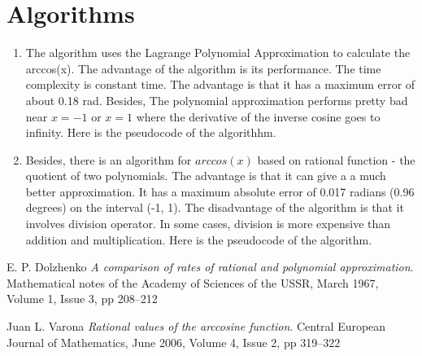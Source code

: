 \documentclass[10pt]{article}
\newcommand{\TITLE}[1]{\item[#1]}
\begin{document}
\section{Algorithms}
\begin{enumerate}
    \item The algorithm uses the Lagrange Polynomial Approximation to calculate the arccos(x). The advantage of the algorithm is its performance. The time complexity is constant time. The advantage is that it has a maximum error of about 0.18 rad. Besides, The polynomial approximation performs pretty bad near $x=-1$ or $x=1$ where the derivative of the inverse cosine goes to infinity. Here is the pseudocode of the algorithhm. \newline
    

    \item Besides, there is an algorithm for $arccos(x)$ based on rational function - the quotient of two polynomials. The advantage is that it can give a a much better approximation. It has a maximum absolute error of 0.017 radians (0.96 degrees) on the interval (-1, 1). The disadvantage of the algorithm is that it involves division operator. In some cases, division is more expensive than addition and multiplication. Here is the pseudocode of the algorithm. \newline
    
\end{enumerate}

\begin{thebibliography}{9}
E. P. Dolzhenko
\textit{A comparison of rates of rational and polynomial approximation}. 
Mathematical notes of the Academy of Sciences of the USSR, March 1967, Volume 1, Issue 3, pp 208–212

Juan L. Varona
\textit{Rational values of the arccosine function}. 
Central European Journal of Mathematics, June 2006, Volume 4, Issue 2, pp 319–322
\end{thebibliography}
 
\end{document}

